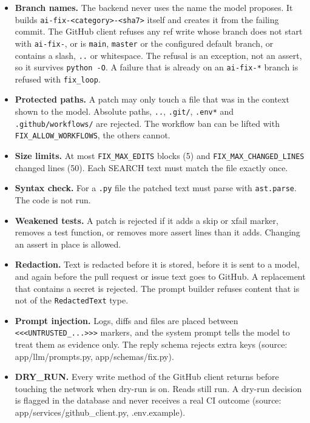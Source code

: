 \begin{itemize}[leftmargin=*, itemsep=2pt]
\item \textbf{Branch names.} The backend never uses the name the model proposes. It builds \texttt{ai-\allowbreak{}fix-\allowbreak{}\textless{}category\textgreater{}-\allowbreak{}\textless{}sha7\textgreater{}} itself and creates it from the failing commit. The GitHub client refuses any ref write whose branch does not start with \texttt{ai-\allowbreak{}fix-\allowbreak{}}, or is \texttt{main}, \texttt{master} or the configured default branch, or contains a slash, \texttt{.\allowbreak{}.\allowbreak{}} or whitespace. The refusal is an exception, not an assert, so it survives \texttt{python -\allowbreak{}O}. A failure that is already on an \texttt{ai-\allowbreak{}fix-\allowbreak{}*} branch is refused with \texttt{fix\_\allowbreak{}loop}.
\item \textbf{Protected paths.} A patch may only touch a file that was in the context shown to the model. Absolute paths, \texttt{.\allowbreak{}.\allowbreak{}}, \texttt{.\allowbreak{}git/\allowbreak{}}, \texttt{.\allowbreak{}env*} and \texttt{.\allowbreak{}github/\allowbreak{}workflows/\allowbreak{}} are rejected. The workflow ban can be lifted with \texttt{FIX\_\allowbreak{}ALLOW\_\allowbreak{}WORKFLOWS}, the others cannot.
\item \textbf{Size limits.} At most \texttt{FIX\_\allowbreak{}MAX\_\allowbreak{}EDITS} blocks (5) and \texttt{FIX\_\allowbreak{}MAX\_\allowbreak{}CHANGED\_\allowbreak{}LINES} changed lines (50). Each SEARCH text must match the file exactly once.
\item \textbf{Syntax check.} For a \texttt{.\allowbreak{}py} file the patched text must parse with \texttt{ast.\allowbreak{}parse}. The code is not run.
\item \textbf{Weakened tests.} A patch is rejected if it adds a skip or xfail marker, removes a test function, or removes more assert lines than it adds. Changing an assert in place is allowed.
\item \textbf{Redaction.} Text is redacted before it is stored, before it is sent to a model, and again before the pull request or issue text goes to GitHub. A replacement that contains a secret is rejected. The prompt builder refuses content that is not of the \texttt{RedactedText} type.
\item \textbf{Prompt injection.} Logs, diffs and files are placed between \texttt{\textless{}\textless{}\textless{}UNTRUSTED\_\allowbreak{}.\allowbreak{}.\allowbreak{}.\allowbreak{}\textgreater{}\textgreater{}\textgreater{}} markers, and the system prompt tells the model to treat them as evidence only. The reply schema rejects extra keys (source: app/\allowbreak{}llm/\allowbreak{}prompts.py, app/\allowbreak{}schemas/\allowbreak{}fix.py).
\item \textbf{DRY\_\allowbreak{}RUN.} Every write method of the GitHub client returns before touching the network when dry-run is on. Reads still run. A dry-run decision is flagged in the database and never receives a real CI outcome (source: app/\allowbreak{}services/\allowbreak{}github\_\allowbreak{}client.py, .env.example).
\end{itemize}

